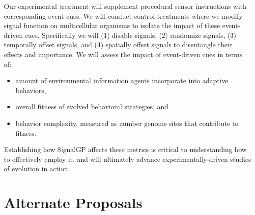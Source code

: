 Our experimental treatment will supplement procedural sensor instructions with corresponding event cues.
We will conduct control treatments where we modify signal function on multicellular organisms to isolate the impact of these event-driven cues.  Specifically we will (1) disable signals, (2) randomize signals, (3) temporally offset signals, and (4) spatially offset signals to disentangle their effects and importance.
We will assess the impact of event-driven cues in terms of:
\begin{itemize}
\item amount of environmental information agents incorporate into adaptive behaviors,
\item overall fitness of evolved behavioral strategies, and
\item behavior complexity, measured as number genome sites that contribute to fitness.
\end{itemize}

Establishing how SignalGP affects these metrics is critical to understanding how to effectively employ it, and will ultimately advance experimentally-driven studies of evolution in action.

\section{Alternate Proposals}

